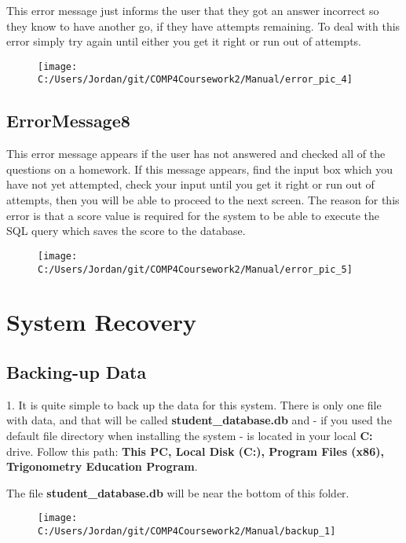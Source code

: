This error message just informs the user that they got an answer incorrect so they know to have another go, if they have attempts remaining. To deal with this error simply try again until either you get it right or run out of attempts.

\begin{figure}[H]
    \texttt{[image: C:/Users/Jordan/git/COMP4Coursework2/Manual/error\_pic\_4]}
\end{figure}

\subsection{ErrorMessage8}

This error message appears if the user has not answered and checked all of the questions on a homework. If this message appears, find the input box which you have not yet attempted, check your input until you get it right or run out of attempts, then you will be able to proceed to the next screen. The reason for this error is that a score value is required for the system to be able to execute the SQL query which saves the score to the database.

\begin{figure}[H]
    \texttt{[image: C:/Users/Jordan/git/COMP4Coursework2/Manual/error\_pic\_5]}
\end{figure}

\section{System Recovery}

\subsection{Backing-up Data}

1. It is quite simple to back up the data for this system. There is only one file with data, and that will be called \textbf{student\_database.db} and - if you used the default file directory when installing the system - is located in your local \textbf{C:} drive. Follow this path: \textbf{This PC, Local Disk (C:), Program Files (x86), Trigonometry Education Program}.

The file \textbf{student\_database.db} will be near the bottom of this folder.

\begin{figure}[H]
    \texttt{[image: C:/Users/Jordan/git/COMP4Coursework2/Manual/backup\_1]}
\end{figure}

